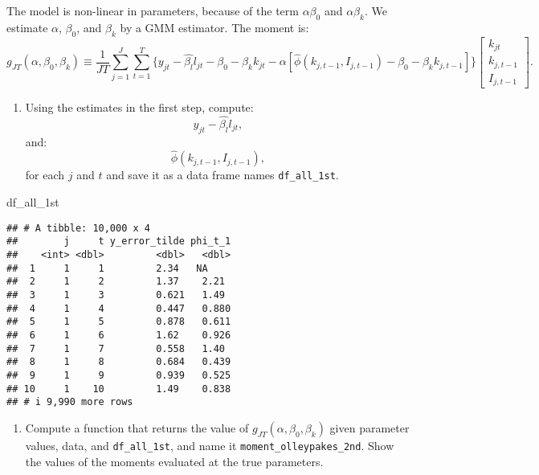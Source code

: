 \documentclass[
]{book}
\newenvironment{Shaded}{\begin{snugshade}}{\end{snugshade}}
\newcommand{\NormalTok}[1]{#1}
\providecommand{\tightlist}{%
  \setlength{\itemsep}{0pt}\setlength{\parskip}{0pt}}
\begin{document}
The model is non-linear in parameters, because of the term \(\alpha \beta_0\) and \(\alpha \beta_k\). We estimate \(\alpha\), \(\beta_0\), and \(\beta_k\) by a GMM estimator. The moment is:
\[
g_{JT}(\alpha, \beta_0, \beta_k) \equiv \frac{1}{JT}\sum_{j = 1}^J \sum_{t = 1}^T \{y_{jt} - \hat{\beta_l} l_{jt} - \beta_0 - \beta_k k_{jt} - \alpha[\hat{\phi}(k_{j, t - 1}, I_{j, t - 1}) - \beta_0 - \beta_k k_{j, t-1}]\} 
\begin{bmatrix}
k_{jt} \\
k_{j, t - 1} \\
I_{j, t - 1}
\end{bmatrix}.
\]

\begin{enumerate}
\def\labelenumi{\arabic{enumi}.}
\setcounter{enumi}{4}
\tightlist
\item
  Using the estimates in the first step, compute:
  \[
  y_{jt} - \hat{\beta_l} l_{jt},
  \]
  and:
  \[
  \hat{\phi}(k_{j, t - 1}, I_{j, t - 1}),
  \]
  for each \(j\) and \(t\) and save it as a data frame names \texttt{df\_all\_1st}.
\end{enumerate}

\begin{Shaded}
\begin{Highlighting}[]
\NormalTok{df\_all\_1st}
\end{Highlighting}
\end{Shaded}

\begin{verbatim}
## # A tibble: 10,000 x 4
##        j     t y_error_tilde phi_t_1
##    <int> <dbl>         <dbl>   <dbl>
##  1     1     1         2.34   NA    
##  2     1     2         1.37    2.21 
##  3     1     3         0.621   1.49 
##  4     1     4         0.447   0.880
##  5     1     5         0.878   0.611
##  6     1     6         1.62    0.926
##  7     1     7         0.558   1.40 
##  8     1     8         0.684   0.439
##  9     1     9         0.939   0.525
## 10     1    10         1.49    0.838
## # i 9,990 more rows
\end{verbatim}

\begin{enumerate}
\def\labelenumi{\arabic{enumi}.}
\setcounter{enumi}{5}
\tightlist
\item
  Compute a function that returns the value of \(g_{JT}(\alpha, \beta_0, \beta_k)\) given parameter values, data, and \texttt{df\_all\_1st}, and name it \texttt{moment\_olleypakes\_2nd}. Show the values of the moments evaluated at the true parameters.
\end{enumerate}
\end{document}
